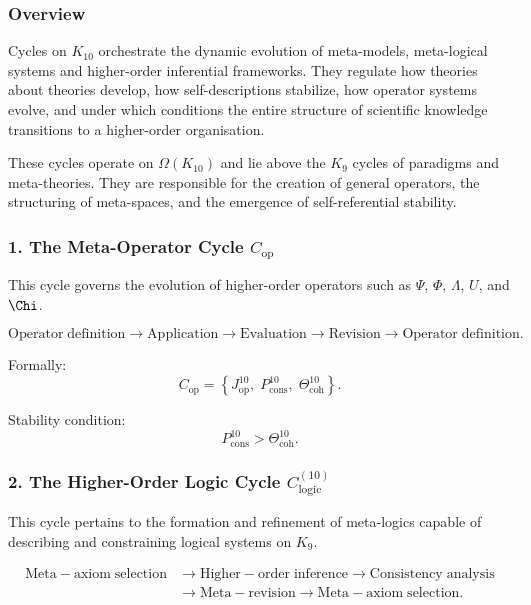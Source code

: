 \subsubsection{Overview}

Cycles on $K_{10}$ orchestrate the dynamic evolution of meta-models,
meta-logical systems and higher-order inferential frameworks. They regulate
how theories about theories develop, how self-descriptions stabilize, how
operator systems evolve, and under which conditions the entire structure of
scientific knowledge transitions to a higher-order organisation.

These cycles operate on $\Omega(K_{10})$ and lie above the $K_9$ cycles of
paradigms and meta-theories. They are responsible for the creation of
general operators, the structuring of meta-spaces, and the emergence of
self-referential stability.


\subsubsection{1. The Meta-Operator Cycle $C_{\mathrm{op}}$}

This cycle governs the evolution of higher-order operators such as
$\Psi$, $\Phi$, $\Lambda$, $U$, and $\Chi$.

\[
  \mathrm{Operator\;definition}
  \to
  \mathrm{Application}
  \to
  \mathrm{Evaluation}
  \to
  \mathrm{Revision}
  \to
  \mathrm{Operator\;definition}.
\]

Formally:
\[
  C_{\mathrm{op}}
  =
  \left\{
    J^{10}_{\mathrm{op}},\;
    P^{10}_{\mathrm{cons}},\;
    \Theta^{10}_{\mathrm{coh}}
  \right\}.
\]

Stability condition:
\[
  P^{10}_{\mathrm{cons}} > \Theta^{10}_\mathrm{coh}.
\]


\subsubsection{2. The Higher-Order Logic Cycle $C_{\mathrm{logic}}^{(10)}$}

This cycle pertains to the formation and refinement of meta-logics capable
of describing and constraining logical systems on $K_9$.

\[
  \begin{aligned}
  \mathrm{Meta\!-\!axiom\;selection}
  &\to \mathrm{Higher\!-\!order\;inference}
  \to \mathrm{Consistency\;analysis}\\
  &\to \mathrm{Meta\!-\!revision}
  \to \mathrm{Meta\!-\!axiom\;selection}.
  \end{aligned}
\]

